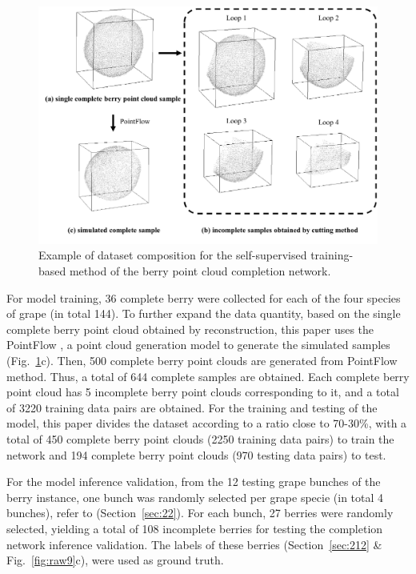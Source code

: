 \documentclass[12pt]{article}
\begin{document}
\begin{figure}[hbt!]
    \centering
    \includegraphics[width=1\textwidth]{figures/Figure9.pdf}
    \caption{Example of dataset composition for the self-supervised training-based method of the berry point cloud completion network.}
    \label{fig:raw12}
\end{figure}

For model training, 36 complete berry were collected for each of the four species of grape (in total 144). 
To further expand the data quantity, based on the single complete berry point cloud obtained by reconstruction, this paper uses the PointFlow \citep{yang_pointflow_2019}, a point cloud generation model to generate the simulated samples (Fig.~\ref{fig:raw12}c). 
Then, 500 complete berry point clouds are generated from PointFlow method. 
Thus, a total of 644 complete samples are obtained. 
Each complete berry point cloud has 5 incomplete berry point clouds corresponding to it, and a total of 3220 training data pairs are obtained. 
For the training and testing of the model, this paper divides the dataset according to a ratio close to 70-30\%, with a total of 450 complete berry point clouds (2250 training data pairs) to train the network and 194 complete berry point clouds (970 testing data pairs) to test.

For the model inference validation, from the 12 testing grape bunches of the berry instance,  one bunch was randomly selected per grape specie (in total 4 bunches), refer to (Section~\ref{sec:22}). 
For each bunch, 27 berries were randomly selected, yielding a total of 108 incomplete berries for testing the completion network inference validation. 
The labels of these berries (Section~\ref{sec:212} \& Fig.~\ref{fig:raw9}c), were used as ground truth.
\end{document}
